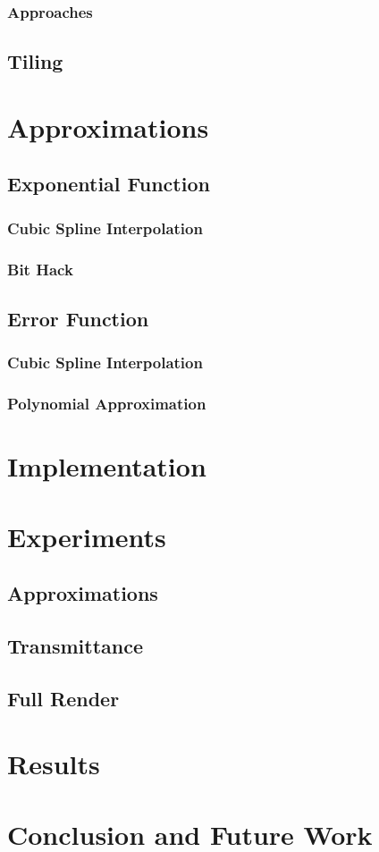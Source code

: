 \documentclass[a4paper, 11pt]{memoir}
\begin{document}
    \subsection{Approaches}
    \section{Tiling}
    
    \chapter{Approximations}
    \section{Exponential Function}
    \subsection{Cubic Spline Interpolation}
    \subsection{Bit Hack}
    \cite{fast_exp}
    
    \section{Error Function}
    \subsection{Cubic Spline Interpolation}
    \subsection{Polynomial Approximation}
    \cite{AbraSteg72}
    
    \chapter{Implementation}
    \cite{own_moeller_16_2}
    
    \chapter{Experiments}
    \cite{hpc_toolkit}
    \section{Approximations}
    \section{Transmittance}
    \section{Full Render}
    
    \chapter{Results}
    
    \chapter{Conclusion and Future Work}

    \backmatter
    \printglossaries
    \printbibliography[heading=bibintoc]
\end{document}
